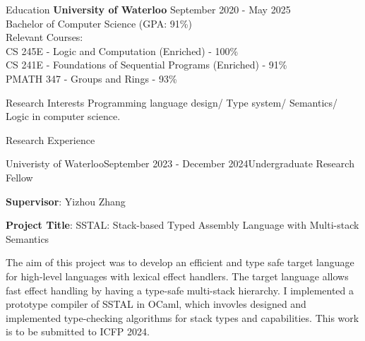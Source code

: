 \documentclass[
	12pt, %
]{resume} %
\begin{document}

\begin{rSection}{Education}
	\textbf{University of Waterloo} \hfill {September 2020 - May 2025} \\ 
	Bachelor of Computer Science (GPA: 91\%) \\
    Relevant Courses: \\
    \hspace*{5mm} CS 245E - Logic and Computation (Enriched) - 100\% \\
    \hspace*{5mm} CS 241E - Foundations of Sequential Programs (Enriched) - 91\% \\
    \hspace*{5mm} PMATH 347 - Groups and Rings - 93\% 
\end{rSection}

\begin{rSection}{Research Interests}
	Programming language design/ Type system/ Semantics/ Logic in computer science.
\end{rSection}

\begin{rSection}{Research Experience}
	\begin{rSubsection}{Univeristy of Waterloo}{September 2023 - December 2024}{Undergraduate Research Fellow}{}
		\item \textbf{Supervisor}: Yizhou Zhang
		\item \textbf{Project Title}: SSTAL: Stack-based Typed Assembly Language with Multi-stack Semantics
		\item The aim of this project was to develop an efficient and type safe target language for high-level languages with lexical effect handlers.
		The target language allows fast effect handling by having a type-safe multi-stack hierarchy.
		I implemented a prototype compiler of SSTAL in OCaml, which invovles designed and implemented type-checking algorithms for stack types and capabilities.
		This work is to be submitted to ICFP 2024.
	\end{rSubsection}
\end{rSection}

\end{document}
